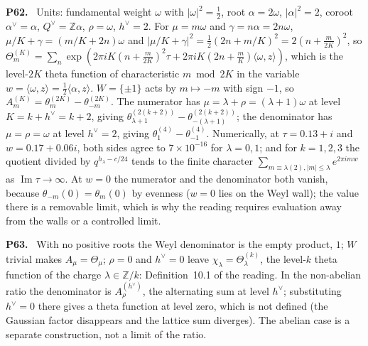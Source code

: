 \documentclass[11pt]{article}
\newcommand{\Z}{\mathbb{Z}}
\newenvironment{solution}[1]{\medskip\noindent\textbf{P#1.}\ }{\par\medskip}
\begin{document}
\begin{solution}{62}
Units: fundamental weight $\omega$ with $|\omega|^2 = \tfrac12$, root $\alpha = 2\omega$,
$|\alpha|^2 = 2$, coroot $\alpha^\vee = \alpha$, $Q^\vee = \Z\alpha$, $\rho = \omega$,
$h^\vee = 2$. For $\mu = m\omega$ and $\gamma = n\alpha = 2n\omega$,
$\mu/K+\gamma = (m/K+2n)\omega$ and $|\mu/K+\gamma|^2 = \tfrac12(2n+m/K)^2 = 2(n+\tfrac{m}{2K})^2$,
so $\Theta^{(K)}_m = \sum_n\exp(2\pi iK(n+\tfrac m{2K})^2\tau + 2\pi iK(2n+\tfrac mK)\langle\omega,z\rangle)$,
which is the level-$2K$ theta function of characteristic $m\bmod 2K$ in the
variable $w = \langle\omega,z\rangle = \tfrac12\langle\alpha,z\rangle$. $W = \{\pm1\}$ acts by $m\mapsto-m$
with sign $-1$, so $A^{(K)}_m = \theta^{(2K)}_m - \theta^{(2K)}_{-m}$. The numerator
has $\mu = \lambda+\rho = (\lambda+1)\omega$ at level $K = k+h^\vee = k+2$, giving
$\theta^{(2(k+2))}_{\lambda+1}-\theta^{(2(k+2))}_{-(\lambda+1)}$; the denominator has
$\mu = \rho = \omega$ at level $h^\vee = 2$, giving $\theta^{(4)}_1-\theta^{(4)}_{-1}$.
Numerically, at $\tau = 0.13+i$ and $w = 0.17+0.06i$, both sides agree to
$7\times10^{-16}$ for $\lambda = 0,1$; and for $k = 1,2,3$ the quotient divided
by $q^{h_\lambda-c/24}$ tends to the finite character $\sum_{m\equiv\lambda(2),|m|\le\lambda}e^{2\pi imw}$
as $\operatorname{Im}\tau\to\infty$. At $w = 0$ the numerator and the
denominator both vanish, because $\theta_{-m}(0) = \theta_m(0)$ by evenness
($w = 0$ lies on the Weyl wall); the value there is a removable limit, which
is why the reading requires evaluation away from the walls or a controlled
limit.
\end{solution}

\begin{solution}{63}
With no positive roots the Weyl denominator is the empty product, $1$;
$W$ trivial makes $A_\mu = \Theta_\mu$; $\rho = 0$ and $h^\vee = 0$ leave
$\chi_\lambda = \Theta^{(k)}_\lambda$, the level-$k$ theta function of the charge
$\lambda\in\Z/k$: Definition~10.1 of the reading. In the non-abelian ratio the
denominator is $A^{(h^\vee)}_\rho$, the alternating sum at level $h^\vee$;
substituting $h^\vee = 0$ there gives a theta function at level zero, which is
not defined (the Gaussian factor disappears and the lattice sum diverges).
The abelian case is a separate construction, not a limit of the ratio.
\end{solution}
\end{document}
